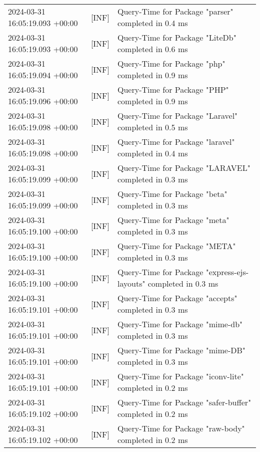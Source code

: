{{\begin{tabularx}{\textwidth}{|l|l|X|}
                    2024-03-31 16:05:19.093 +00:00 & [INF] & Query-Time for Package "parser" completed in 0.4 ms \\
                    2024-03-31 16:05:19.093 +00:00 & [INF] & Query-Time for Package "LiteDb" completed in 0.6 ms \\
                    2024-03-31 16:05:19.094 +00:00 & [INF] & Query-Time for Package "php" completed in 0.9 ms \\
                    2024-03-31 16:05:19.096 +00:00 & [INF] & Query-Time for Package "PHP" completed in 0.9 ms \\
                    2024-03-31 16:05:19.098 +00:00 & [INF] & Query-Time for Package "Laravel" completed in 0.5 ms \\
                    2024-03-31 16:05:19.098 +00:00 & [INF] & Query-Time for Package "laravel" completed in 0.4 ms \\
                    2024-03-31 16:05:19.099 +00:00 & [INF] & Query-Time for Package "LARAVEL" completed in 0.3 ms \\
                    2024-03-31 16:05:19.099 +00:00 & [INF] & Query-Time for Package "beta" completed in 0.3 ms \\
                    2024-03-31 16:05:19.100 +00:00 & [INF] & Query-Time for Package "meta" completed in 0.3 ms \\
                    2024-03-31 16:05:19.100 +00:00 & [INF] & Query-Time for Package "META" completed in 0.3 ms \\
                    2024-03-31 16:05:19.100 +00:00 & [INF] & Query-Time for Package "express-ejs-layouts" completed in 0.3 ms \\
                    2024-03-31 16:05:19.101 +00:00 & [INF] & Query-Time for Package "accepts" completed in 0.3 ms \\
                    2024-03-31 16:05:19.101 +00:00 & [INF] & Query-Time for Package "mime-db" completed in 0.3 ms \\
                    2024-03-31 16:05:19.101 +00:00 & [INF] & Query-Time for Package "mime-DB" completed in 0.3 ms \\
                    2024-03-31 16:05:19.101 +00:00 & [INF] & Query-Time for Package "iconv-lite" completed in 0.2 ms \\
                    2024-03-31 16:05:19.102 +00:00 & [INF] & Query-Time for Package "safer-buffer" completed in 0.2 ms \\
                    2024-03-31 16:05:19.102 +00:00 & [INF] & Query-Time for Package "raw-body" completed in 0.2 ms \\

\end{tabularx}}}
